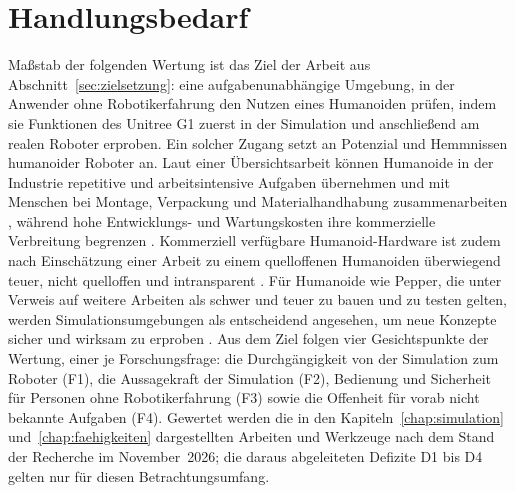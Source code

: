 \section{Handlungsbedarf}
\label{sec:handlungsbedarf}
Maßstab der folgenden Wertung ist das Ziel der Arbeit aus Abschnitt~\ref{sec:zielsetzung}: eine aufgabenunabhängige Umgebung, in der Anwender ohne Robotikerfahrung den Nutzen eines Humanoiden prüfen, indem sie Funktionen des Unitree G1 zuerst in der Simulation und anschließend am realen Roboter erproben.
Ein solcher Zugang setzt an Potenzial und Hemmnissen humanoider Roboter an.
Laut einer Übersichtsarbeit können Humanoide in der Industrie repetitive und arbeitsintensive Aufgaben übernehmen und mit Menschen bei Montage, Verpackung und Materialhandhabung zusammenarbeiten \cite{Tong2024}, während hohe Entwicklungs- und Wartungskosten ihre kommerzielle Verbreitung begrenzen \cite{Tong2024}.
Kommerziell verfügbare Humanoid-Hardware ist zudem nach Einschätzung einer Arbeit zu einem quelloffenen Humanoiden überwiegend teuer, nicht quelloffen und intransparent \cite{Chi2025}.
Für Humanoide wie Pepper, die unter Verweis auf weitere Arbeiten als schwer und teuer zu bauen und zu testen gelten, werden Simulationsumgebungen als entscheidend angesehen, um neue Konzepte sicher und wirksam zu erproben \cite{Sekkat2024}.
Aus dem Ziel folgen vier Gesichtspunkte der Wertung, einer je Forschungsfrage: die Durchgängigkeit von der Simulation zum Roboter (F1), die Aussagekraft der Simulation (F2), Bedienung und Sicherheit für Personen ohne Robotikerfahrung (F3) sowie die Offenheit für vorab nicht bekannte Aufgaben (F4).
Gewertet werden die in den Kapiteln~\ref{chap:simulation} und~\ref{chap:faehigkeiten} dargestellten Arbeiten und Werkzeuge nach dem Stand der Recherche im November~2026; die daraus abgeleiteten Defizite D1 bis D4 gelten nur für diesen Betrachtungsumfang.

